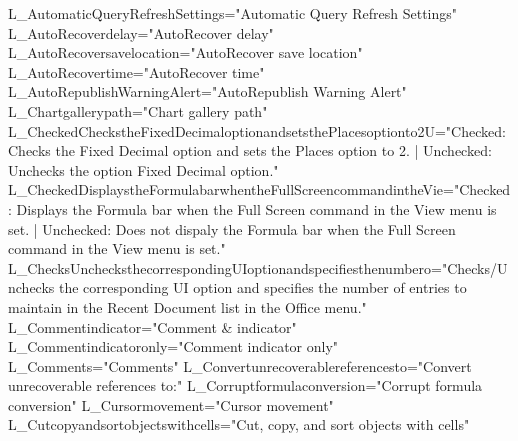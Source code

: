  
 L _ A u t o m a t i c Q u e r y R e f r e s h S e t t i n g s = " A u t o m a t i c   Q u e r y   R e f r e s h   S e t t i n g s " 
 
 L _ A u t o R e c o v e r d e l a y = " A u t o R e c o v e r   d e l a y " 
 
 L _ A u t o R e c o v e r s a v e l o c a t i o n = " A u t o R e c o v e r   s a v e   l o c a t i o n " 
 
 L _ A u t o R e c o v e r t i m e = " A u t o R e c o v e r   t i m e " 
 
 L _ A u t o R e p u b l i s h W a r n i n g A l e r t = " A u t o R e p u b l i s h   W a r n i n g   A l e r t " 
 
 L _ C h a r t g a l l e r y p a t h = " C h a r t   g a l l e r y   p a t h " 
 
 L _ C h e c k e d C h e c k s t h e F i x e d D e c i m a l o p t i o n a n d s e t s t h e P l a c e s o p t i o n t o 2 U = " C h e c k e d :   C h e c k s   t h e   F i x e d   D e c i m a l   o p t i o n   a n d   s e t s   t h e   P l a c e s   o p t i o n   t o   2 .   |   U n c h e c k e d :   U n c h e c k s   t h e   o p t i o n   F i x e d   D e c i m a l   o p t i o n . " 
 
 L _ C h e c k e d D i s p l a y s t h e F o r m u l a b a r w h e n t h e F u l l S c r e e n c o m m a n d i n t h e V i e = " C h e c k e d :   D i s p l a y s   t h e   F o r m u l a   b a r   w h e n   t h e   F u l l   S c r e e n   c o m m a n d   i n   t h e   V i e w   m e n u   i s   s e t .   |   U n c h e c k e d :   D o e s   n o t   d i s p a l y   t h e   F o r m u l a   b a r   w h e n   t h e   F u l l   S c r e e n   c o m m a n d   i n   t h e   V i e w   m e n u   i s   s e t . " 
 
 L _ C h e c k s U n c h e c k s t h e c o r r e s p o n d i n g U I o p t i o n a n d s p e c i f i e s t h e n u m b e r o = " C h e c k s / U n c h e c k s   t h e   c o r r e s p o n d i n g   U I   o p t i o n   a n d   s p e c i f i e s   t h e   n u m b e r   o f   e n t r i e s   t o   m a i n t a i n   i n   t h e   R e c e n t   D o c u m e n t   l i s t   i n   t h e   O f f i c e   m e n u . " 
 
 L _ C o m m e n t i n d i c a t o r = " C o m m e n t   &   i n d i c a t o r " 
 
 L _ C o m m e n t i n d i c a t o r o n l y = " C o m m e n t   i n d i c a t o r   o n l y " 
 
 L _ C o m m e n t s = " C o m m e n t s " 
 
 L _ C o n v e r t u n r e c o v e r a b l e r e f e r e n c e s t o = " C o n v e r t   u n r e c o v e r a b l e   r e f e r e n c e s   t o : " 
 
 L _ C o r r u p t f o r m u l a c o n v e r s i o n = " C o r r u p t   f o r m u l a   c o n v e r s i o n " 
 
 L _ C u r s o r m o v e m e n t = " C u r s o r   m o v e m e n t " 
 
 L _ C u t c o p y a n d s o r t o b j e c t s w i t h c e l l s = " C u t ,   c o p y ,   a n d   s o r t   o b j e c t s   w i t h   c e l l s " 
